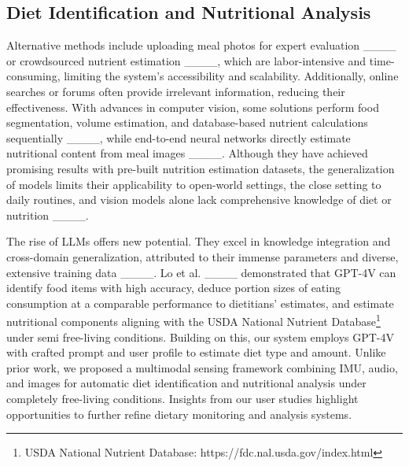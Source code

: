 \subsection{Diet Identification and Nutritional Analysis}
Alternative methods include uploading meal photos for expert evaluation ____ or crowdsourced nutrient estimation ____, which are labor-intensive and time-consuming, limiting the system's accessibility and scalability. 
Additionally, online searches or forums often provide irrelevant information, reducing their effectiveness.
With advances in computer vision, some solutions perform food segmentation, volume estimation, and database-based nutrient calculations sequentially ____, while end-to-end neural networks directly estimate nutritional content from meal images ____. 
Although they have achieved promising results with pre-built nutrition estimation datasets, the generalization of models limits their applicability to open-world settings, the close setting to daily routines, and vision models alone lack comprehensive knowledge of diet or nutrition ____.   

The rise of LLMs offers new potential. They excel in knowledge integration and cross-domain generalization, attributed to their immense parameters and diverse, extensive training data ____. 
Lo et al. ____ demonstrated that GPT-4V can identify food items with high accuracy, deduce portion sizes of eating consumption at a comparable performance to dietitians' estimates, and estimate nutritional components aligning with the USDA National Nutrient Database\footnote{USDA National Nutrient Database: https://fdc.nal.usda.gov/index.html} under semi free-living conditions.
Building on this, our \shortname system employs GPT-4V with crafted prompt and user profile to estimate diet type and amount. Unlike prior work, we proposed a multimodal sensing framework combining IMU, audio, and images for automatic diet identification and nutritional analysis under completely free-living conditions. Insights from our user studies highlight opportunities to further refine dietary monitoring and analysis systems.


